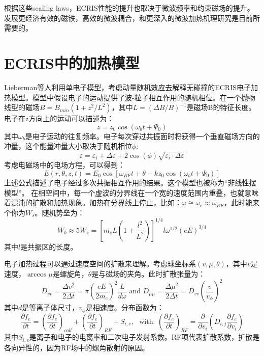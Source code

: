 \documentclass[fontset=windows]{article}
\begin{document}
根据这些scaling laws，ECRIS性能的提升也取决于微波频率和约束磁场的提升。发展更经济有效的磁铁，高效的微波耦合，和更深入的微波加热机理研究是目前所需要的。

\section{ECRIS中的加热模型}
Lieberman等人利用单电子模型，考虑动量随机效应去解释无碰撞的ECRIS电子加热模型。模型中假设电子的运动提供了波-粒子相互作用的随机相位。在一个抛物线型的磁场$B=B_{min}(1+z^2/L^2)$，其中$L=(\Delta B/ B)^{-1}$是磁场B的特征长度。电子在z方向上的运动可以描述为：
\begin{equation}
    z=z_0 \cos(\omega_b t+\varPsi_0)
\end{equation}
其中$\omega_b$是电子运动的往复频率。电子每次穿过共振面时将获得一个垂直磁场方向的冲量，这个能量冲量大小取决于随机相位$\phi$:
\begin{equation}
    \varepsilon=\varepsilon_i+\Delta\varepsilon+2\cos(\phi)\sqrt{\varepsilon_i\cdot\Delta\varepsilon}
\end{equation}
考虑电磁场中的电场方程，可以得到：
\begin{equation}
    E(r,\theta,z,t)=E_0\cos[\omega_{RF}t+\theta-kz_0\cos(\omega_b t+\Psi_0)]
\end{equation}
上述公式描述了电子经过多次共振相互作用的结果。这个模型也被称为“非线性摆模型”。
在相空间中，每一个虚波的分界线在一个宽的速度范围内重叠，也就意味着混沌的扩散和加热现象。加热在分界线上停止，比如：$\omega\cong\omega_c\approx\omega_{RF}$，此时能来个你为$W_s$。随机势垒为：
\begin{equation}
    W_b\approx 5W_s=[m_eL(1+\frac{l^2}{L^2})]^{1/4}l\omega^{1/2}(eE)^{3/4}
\end{equation}
其中$l$是共振区的长度。

电子加热过程可以通过速度空间的扩散来理解。考虑球坐标系$(v,\mu,\theta)$，其中$v$是速度，$\arccos \mu$是螺旋角，$\theta$是与磁场的夹角。此时扩散张量为：
\begin{equation}
    D_{vv}=\frac{\Delta v^2}{2\Delta t}=\pi(\frac{eE}{2m_e})^{2}\frac{L}{d\omega}\,\, \text{and} \,\, D_{\mu\mu}=\frac{\Delta\mu^2}{2\Delta t}=D_{vv}(\frac{v}{v_\phi})^{2}
    \label{e-10}
\end{equation}
其中$d$是等离子体尺寸，$v_\phi$是相速度。分布函数为：
\begin{equation}
    \frac{\partial f_e}{\partial t}=\left(\frac{\partial f_e}{\partial t}\right)_{coll}+\left(\frac{\partial f_e}{\partial t}\right)_{RF}+S_{i,e},\,\,\,\, \text{with: }\left(\frac{\partial f_e}{\partial t}\right)_{RF}=\frac{\partial}{\partial v_i}\left(D_{i,j}\frac{\partial f_e}{\partial v_i}\right)
\end{equation}
其中$S_{i,e}$是离子和电子的电离率和二次电子发射系数。RF项代表扩散系数，扩散是各向异性的，因为RF场中的螺角散射的原因。
\end{document}
